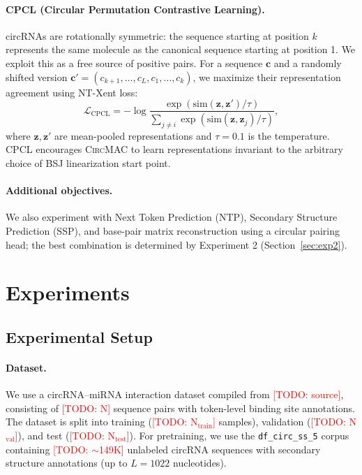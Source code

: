 \documentclass[10pt,twocolumn]{article}
\newcommand{\todo}[1]{\textcolor{red}{[TODO: #1]}}
\newcommand{\circmac}{\textsc{CircMAC}}
\begin{document}
\paragraph{CPCL (Circular Permutation Contrastive Learning).}
circRNAs are rotationally symmetric: the sequence starting at position
$k$ represents the same molecule as the canonical sequence starting at
position 1. We exploit this as a free source of positive pairs.
For a sequence $\mathbf{c}$ and a randomly shifted version
$\mathbf{c}' = (c_{k+1}, \ldots, c_L, c_1, \ldots, c_k)$,
we maximize their representation agreement using NT-Xent loss:
\begin{equation}
  \mathcal{L}_{\text{CPCL}} = -\log
    \frac{\exp(\text{sim}(\mathbf{z}, \mathbf{z}') / \tau)}
         {\sum_{j \neq i} \exp(\text{sim}(\mathbf{z}, \mathbf{z}_j) / \tau)},
\end{equation}
where $\mathbf{z}, \mathbf{z}'$ are mean-pooled representations and
$\tau=0.1$ is the temperature.
CPCL encourages \circmac{} to learn representations invariant to the
arbitrary choice of BSJ linearization start point.

\paragraph{Additional objectives.}
We also experiment with Next Token Prediction (NTP), Secondary Structure
Prediction (SSP), and base-pair matrix reconstruction using a circular
pairing head; the best combination is determined by Experiment 2
(Section~\ref{sec:exp2}).

\section{Experiments}
\label{sec:experiments}

\subsection{Experimental Setup}
\label{sec:setup}

\paragraph{Dataset.}
We use a circRNA--miRNA interaction dataset compiled from \todo{source},
consisting of \todo{N} sequence pairs with token-level binding site
annotations. The dataset is split into training (\todo{N$_{\text{train}}$}
samples), validation (\todo{N$_{\text{val}}$}), and test
(\todo{N$_{\text{test}}$}).
For pretraining, we use the \texttt{df\_circ\_ss\_5} corpus containing
\todo{$\sim$149K} unlabeled circRNA sequences with secondary structure
annotations (up to $L{=}1022$ nucleotides).
\end{document}
